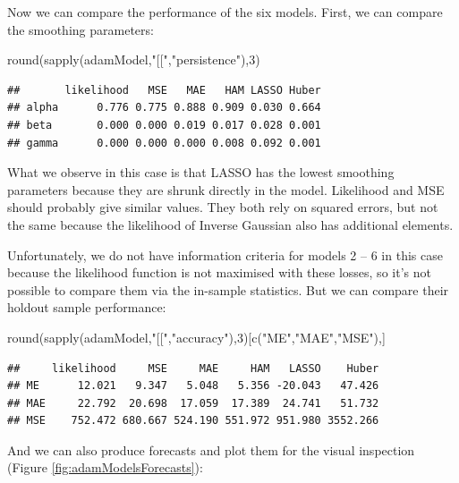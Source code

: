 \documentclass[
]{book}
\newenvironment{Shaded}{\begin{snugshade}}{\end{snugshade}}
\newcommand{\DecValTok}[1]{\textcolor[rgb]{0.00,0.00,0.81}{#1}}
\newcommand{\FunctionTok}[1]{\textcolor[rgb]{0.00,0.00,0.00}{#1}}
\newcommand{\NormalTok}[1]{#1}
\newcommand{\StringTok}[1]{\textcolor[rgb]{0.31,0.60,0.02}{#1}}
\theoremstyle{definition}
\theoremstyle{definition}
\theoremstyle{definition}
\theoremstyle{definition}
\theoremstyle{remark}
\begin{document}
Now we can compare the performance of the six models. First, we can compare the smoothing parameters:

\begin{Shaded}
\begin{Highlighting}[]
\FunctionTok{round}\NormalTok{(}\FunctionTok{sapply}\NormalTok{(adamModel,}\StringTok{"[["}\NormalTok{,}\StringTok{"persistence"}\NormalTok{),}\DecValTok{3}\NormalTok{)}
\end{Highlighting}
\end{Shaded}

\begin{verbatim}
##       likelihood   MSE   MAE   HAM LASSO Huber
## alpha      0.776 0.775 0.888 0.909 0.030 0.664
## beta       0.000 0.000 0.019 0.017 0.028 0.001
## gamma      0.000 0.000 0.000 0.008 0.092 0.001
\end{verbatim}

What we observe in this case is that LASSO has the lowest smoothing parameters because they are shrunk directly in the model. Likelihood and MSE should probably give similar values. They both rely on squared errors, but not the same because the likelihood of Inverse Gaussian also has additional elements.

Unfortunately, we do not have information criteria for models 2 -- 6 in this case because the likelihood function is not maximised with these losses, so it's not possible to compare them via the in-sample statistics. But we can compare their holdout sample performance:

\begin{Shaded}
\begin{Highlighting}[]
\FunctionTok{round}\NormalTok{(}\FunctionTok{sapply}\NormalTok{(adamModel,}\StringTok{"[["}\NormalTok{,}\StringTok{"accuracy"}\NormalTok{),}\DecValTok{3}\NormalTok{)[}\FunctionTok{c}\NormalTok{(}\StringTok{"ME"}\NormalTok{,}\StringTok{"MAE"}\NormalTok{,}\StringTok{"MSE"}\NormalTok{),]}
\end{Highlighting}
\end{Shaded}

\begin{verbatim}
##     likelihood     MSE     MAE     HAM   LASSO    Huber
## ME      12.021   9.347   5.048   5.356 -20.043   47.426
## MAE     22.792  20.698  17.059  17.389  24.741   51.732
## MSE    752.472 680.667 524.190 551.972 951.980 3552.266
\end{verbatim}

And we can also produce forecasts and plot them for the visual inspection (Figure \ref{fig:adamModelsForecasts}):
\end{document}
